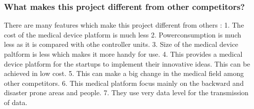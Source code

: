 
\subsubsection{What makes this project different from other competitors?}

There are many features which make this project different from others :
1. The cost of the medical device platform is much less
2. Powerconsumption is much less as it is compared with othe controller units.
3. Size of the medical device paltform is less which makes it more handy for use.
4. This provides a medical device platform for the startups to implement their innovative ideas. This can be achieved in low cost.
5. This can make a big change in the medical field among other competitors.
6. This medical platform focus mainly on the backward and disaster prone areas and people.
7. They use very data level for the transmission of data.   
